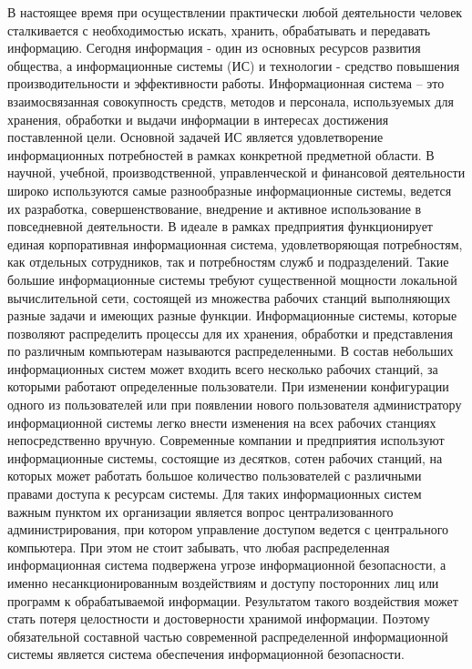 \documentclass{../class/UIR}
\begin{document}
 
\maketitle

\maketz 

\tableofcontents
{}
В настоящее  время при осуществлении практически любой деятельности человек сталкивается с необходимостью искать, хранить, обрабатывать и передавать информацию.
Сегодня информация  -  один из основных ресурсов развития общества, а информационные системы (ИС) и технологии - средство повышения производительности и эффективности работы. 
Информационная система – это взаимосвязанная совокупность средств, методов и персонала, используемых для хранения, обработки и выдачи информации в интересах достижения поставленной цели. Основной задачей ИС является удовлетворение информационных потребностей в рамках конкретной предметной области. 
В научной, учебной, производственной, управленческой и финансовой деятельности широко используются самые разнообразные информационные системы, ведется их разработка, совершенствование, внедрение и активное использование в повседневной деятельности.
В идеале в рамках предприятия функционирует единая корпоративная информационная система, удовлетворяющая  потребностям, как отдельных сотрудников, так и потребностям служб и подразделений.
Такие большие информационные системы требуют существенной  мощности локальной вычислительной сети, состоящей из множества рабочих станций выполняющих разные задачи и имеющих разные функции. 
Информационные системы, которые позволяют распределить процессы для их хранения, обработки и представления по различным компьютерам называются распределенными. 
В состав небольших информационных систем может входить всего несколько рабочих станций, за которыми работают определенные пользователи. При изменении конфигурации одного из пользователей или при появлении нового пользователя администратору информационной системы легко внести изменения на всех рабочих станциях непосредственно вручную.
 Современные компании и предприятия используют информационные системы, состоящие из десятков, сотен рабочих станций, на которых может работать большое количество пользователей с различными правами доступа к ресурсам системы. Для таких информационных систем важным пунктом их организации является вопрос централизованного администрирования, при котором управление доступом ведется с центрального компьютера.
При этом не стоит забывать, что любая распределенная информационная система подвержена угрозе информационной безопасности, а именно несанкционированным воздействиям и доступу посторонних лиц или программ к обрабатываемой информации. Результатом такого воздействия может стать потеря целостности и достоверности хранимой информации. Поэтому обязательной составной частью современной распределенной информационной системы является система обеспечения информационной безопасности.
\end{document}

